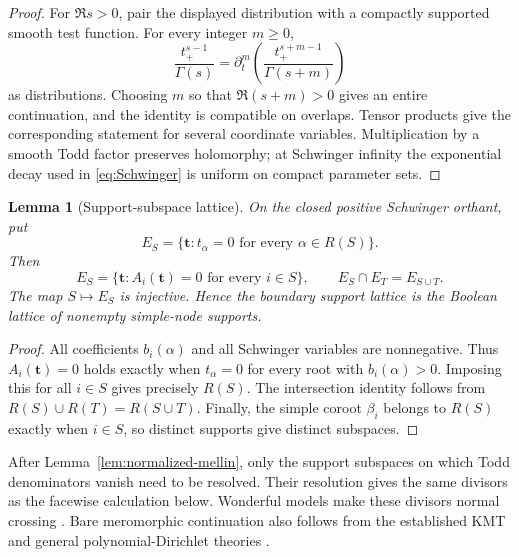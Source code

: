 \documentclass[11pt]{article}
\newtheorem{lemma}[theorem]{Lemma}
\begin{document}
\begin{proof}
For \(\Re s>0\), pair the displayed distribution with a compactly
supported smooth test function.  For every integer \(m\geq0\),
\[
 \frac{t_+^{s-1}}{\Gamma(s)}
 =\partial_t^m\!\left(\frac{t_+^{s+m-1}}{\Gamma(s+m)}\right)
\]
as distributions.  Choosing \(m\) so that \(\Re(s+m)>0\) gives an
entire continuation, and the identity is compatible on overlaps.  Tensor
products give the corresponding statement for several coordinate
variables.  Multiplication by a smooth Todd factor preserves
holomorphy; at Schwinger infinity the exponential decay used in
\eqref{eq:Schwinger} is uniform on compact parameter sets.
\end{proof}

\begin{lemma}[Support-subspace lattice]
\label{lem:support-lattice}
On the closed positive Schwinger orthant, put
\[
 E_S=\{\mathbf t:t_\alpha=0\text{ for every }\alpha\in R(S)\}.
\]
Then
\[
 E_S=\{\mathbf t:A_i(\mathbf t)=0\text{ for every }i\in S\},
 \qquad E_S\cap E_T=E_{S\cup T}.
\]
The map \(S\mapsto E_S\) is injective.  Hence the boundary support
lattice is the Boolean lattice of nonempty simple-node supports.
\end{lemma}

\begin{proof}
All coefficients \(b_i(\alpha)\) and all Schwinger variables are
nonnegative.  Thus \(A_i(\mathbf t)=0\) holds exactly when
\(t_\alpha=0\) for every root with \(b_i(\alpha)>0\).  Imposing this for
all \(i\in S\) gives precisely \(R(S)\).  The intersection identity
follows from \(R(S)\cup R(T)=R(S\cup T)\).  Finally, the simple coroot
\(\beta_i\) belongs to \(R(S)\) exactly when \(i\in S\), so distinct
supports give distinct subspaces.
\end{proof}

After Lemma~\ref{lem:normalized-mellin}, only the support subspaces on
which Todd denominators vanish need to be resolved.  Their resolution
gives the same divisors as the facewise calculation below.  Wonderful
models make these divisors normal crossing
\cite{DeConciniProcesi1995,Li2009}.  Bare meromorphic continuation also
follows from the established KMT and general polynomial-Dirichlet
theories \cite{Essouabri1997,KMT2010PLMS}.
\end{document}

